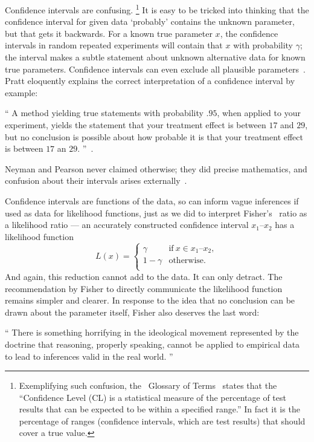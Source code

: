 Confidence intervals are confusing.%
\footnote{%
Exemplifying such confusion,
the \atlas\ Glossary of Terms~\cite{atlas2022glossary} states that the
``Confidence Level (CL) is a statistical measure of the percentage of test
results that can be expected to be within a specified range.''
In fact it is the percentage of ranges
(confidence intervals, which are test results)
that should cover a true value.%
}
It is easy to be tricked into thinking that the confidence interval for given
data `probably' contains the unknown parameter, but that gets it backwards.
For a known true parameter $x$, the confidence intervals in random repeated
experiments will contain that $x$ with probability $\gamma$;
the interval makes a subtle statement about unknown alternative data for
known true parameters.
Confidence intervals can even exclude all plausible parameters~\cite{
pratt1961testing,
Jaynes1976intervals
}.
Pratt eloquently explains the correct interpretation of a confidence interval
by example:
\begin{displayquote}
\small
``%
A method yielding true statements with probability $.95$, when applied to your
experiment, yields the statement that your treatment effect is between $17$ and
$29$, but no conclusion is possible about how probable it is that your
treatment effect is between $17$ an $29$.%
''~\cite{pratt1961testing}.
\end{displayquote}
Neyman and Pearson never claimed otherwise; they did precise mathematics, and
confusion about their intervals arises externally~\cite{jaynes2003probability}.

Confidence intervals are functions of the data, so can inform vague inferences
if used as data for likelihood functions, just as we did to interpret Fisher's
\pvalue\ ratio as a likelihood ratio ---
an accurately constructed confidence interval $x_1\textrm{--}x_2$ has a
likelihood function
\begin{equation}
L(x) =
\left\{
\begin{matrix}
\gamma & \textrm{if}~x \in x_1\textrm{--}x_2, \\
1 - \gamma & \textrm{otherwise.} \\
\end{matrix}
\right.
\end{equation}
And again, this reduction cannot add to the data.
It can only detract.
The recommendation by Fisher to directly communicate the likelihood function
remains simpler and clearer.
In response to the idea that no conclusion can be drawn about the parameter
itself, Fisher also deserves the last word:
\begin{displayquote}
\small
``%
There is something horrifying in the ideological movement represented by the
doctrine that reasoning, properly speaking, cannot be applied to empirical data
to lead to inferences valid in the real world.%
''~\cite{fisher1956statistical}
\end{displayquote}

